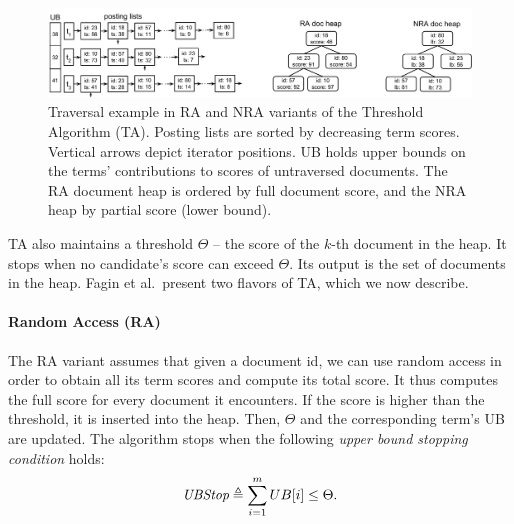 

\begin{figure}[tbh]
\centering
\includegraphics[width=0.95\linewidth]{figures/postingsLists}
\caption{Traversal example in  RA and NRA variants of the Threshold Algorithm (TA). Posting lists are sorted by decreasing term scores. Vertical arrows depict iterator positions.  UB  holds upper bounds on the terms' contributions to scores of untraversed documents. The RA document heap is ordered by full document score, and the NRA heap  by partial score (lower bound).}
\label{fig:lists}
\end{figure}

TA also maintains a threshold $\Theta$ -- the score of the $k$-th document in the heap.
It stops when no candidate's score can exceed $\Theta$. Its output is the set of documents in the heap.
Fagin et al.\ present two flavors of TA, which we now describe.

\paragraph{Random Access (RA)} 
The RA variant assumes that given a document id, we can use random access in order to obtain all its term scores and compute its total score. It thus computes the full score for every document it encounters. If the score is higher than the threshold, it is inserted into the heap. Then, $\Theta$ and the corresponding term's UB are updated. The algorithm stops when 
the following \emph{upper bound stopping condition} holds:
\begin{equation} \label{eq:stop}
\textit{UBStop} \triangleq \sum_{i=1}^m UB[i] \le \Theta.
\end{equation}

